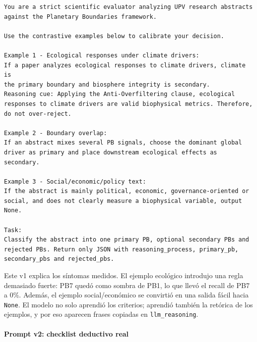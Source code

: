 {\footnotesize
\begin{verbatim}
You are a strict scientific evaluator analyzing UPV research abstracts
against the Planetary Boundaries framework.

Use the contrastive examples below to calibrate your decision.

Example 1 - Ecological responses under climate drivers:
If a paper analyzes ecological responses to climate drivers, climate is
the primary boundary and biosphere integrity is secondary.
Reasoning cue: Applying the Anti-Overfiltering clause, ecological
responses to climate drivers are valid biophysical metrics. Therefore,
do not over-reject.

Example 2 - Boundary overlap:
If an abstract mixes several PB signals, choose the dominant global
driver as primary and place downstream ecological effects as secondary.

Example 3 - Social/economic/policy text:
If the abstract is mainly political, economic, governance-oriented or
social, and does not clearly measure a biophysical variable, output None.

Task:
Classify the abstract into one primary PB, optional secondary PBs and
rejected PBs. Return only JSON with reasoning_process, primary_pb,
secondary_pbs and rejected_pbs.
\end{verbatim}
}

Este v1 explica los síntomas medidos. El ejemplo ecológico introdujo una regla demasiado fuerte: PB7 quedó como sombra de PB1, lo que llevó el recall de PB7 a 0\%. Además, el ejemplo social/económico se convirtió en una salida fácil hacia \texttt{None}. El modelo no solo aprendió los criterios; aprendió también la retórica de los ejemplos, y por eso aparecen frases copiadas en \texttt{llm\_reasoning}.

\paragraph*{Prompt v2: checklist deductivo real}


